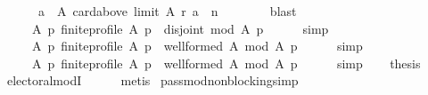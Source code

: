 \begin{isabellebody}
\ \ \ \ \ \ {\isacharbraceleft}{\kern0pt}a\ {\isasymin}\ A{\isachardot}{\kern0pt}\ card{\isacharparenleft}{\kern0pt}above\ {\isacharparenleft}{\kern0pt}limit\ A\ r{\isacharparenright}{\kern0pt}\ a{\isacharparenright}{\kern0pt}\ {\isasymle}\ n{\isacharbraceright}{\kern0pt}\ {\isacharequal}{\kern0pt}\ {\isacharbraceleft}{\kern0pt}{\isacharbraceright}{\kern0pt}{\isachardoublequoteclose}\isanewline
\ \ \ \ \isamarkupfalse%
\ blast\isanewline
\ \ \isamarkupfalse%
\ {}{\isacharcolon}{\kern0pt}\isanewline
\ \ \ \ {\isachardoublequoteopen}{\isasymforall}\ A\ p{\isachardot}{\kern0pt}\ finite{\isacharunderscore}{\kern0pt}profile\ A\ p\ {\isasymlongrightarrow}\ disjoint{}\ {\isacharparenleft}{\kern0pt}{\isacharquery}{\kern0pt}mod\ A\ p{\isacharparenright}{\kern0pt}{\isachardoublequoteclose}\isanewline
\ \ \ \ \isamarkupfalse%
\ simp\isanewline
\ \ \isamarkupfalse%
\ {}\ {}\isanewline
\ \ \isamarkupfalse%
\isanewline
\ \ \ \ {\isachardoublequoteopen}{\isasymforall}\ A\ p{\isachardot}{\kern0pt}\ finite{\isacharunderscore}{\kern0pt}profile\ A\ p\ {\isasymlongrightarrow}\ well{\isacharunderscore}{\kern0pt}formed\ A\ {\isacharparenleft}{\kern0pt}{\isacharquery}{\kern0pt}mod\ A\ p{\isacharparenright}{\kern0pt}{\isachardoublequoteclose}\isanewline
\ \ \ \ \isamarkupfalse%
\ simp\isanewline
\ \ \isamarkupfalse%
\isanewline
\ \ \ \ {\isachardoublequoteopen}{\isasymforall}\ A\ p{\isachardot}{\kern0pt}\ finite{\isacharunderscore}{\kern0pt}profile\ A\ p\ {\isasymlongrightarrow}\ well{\isacharunderscore}{\kern0pt}formed\ A\ {\isacharparenleft}{\kern0pt}{\isacharquery}{\kern0pt}mod\ A\ p{\isacharparenright}{\kern0pt}{\isachardoublequoteclose}\isanewline
\ \ \ \ \isamarkupfalse%
\ simp\isanewline
\ \ \isamarkupfalse%
\ {\isacharquery}{\kern0pt}thesis\isanewline
\ \ \ \ \isamarkupfalse%
\ electoral{\isacharunderscore}{\kern0pt}modI\isanewline
\ \ \ \ \isamarkupfalse%
\ metis\isanewline
{}\isamarkupfalse%
%
\endisatagproof
{\isafoldproof}%
%
\isadelimproof
%
\endisadelimproof
%
\isadelimdocument
%
\endisadelimdocument
%
\isatagdocument
%
\isamarkuptrue%
%
\endisatagdocument
{\isafolddocument}%
%
\isadelimdocument
%
\endisadelimdocument
{}\isamarkupfalse%
\ pass{\isacharunderscore}{\kern0pt}mod{\isacharunderscore}{\kern0pt}non{\isacharunderscore}{\kern0pt}blocking{\isacharbrackleft}{\kern0pt}simp{\isacharbrackright}{\kern0pt}{\isacharcolon}{\kern0pt}\isanewline

\end{isabellebody}
